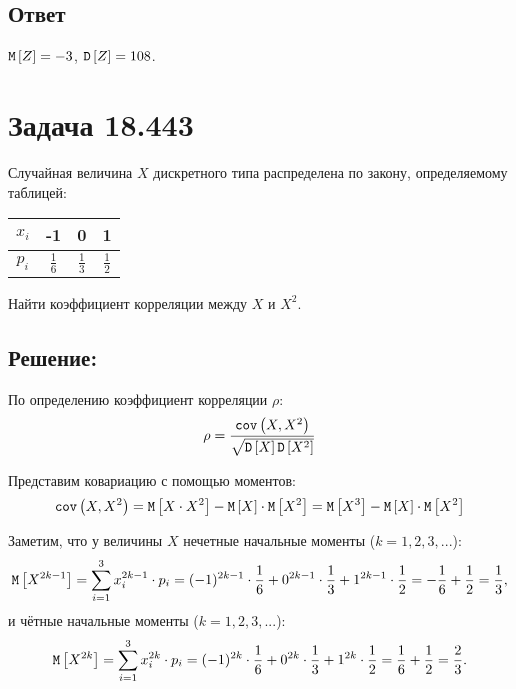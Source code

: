 \subsection*{Ответ}
$\mathtt{M} \left [ Z \right ] = -3$, $\mathtt{D} \left [ Z \right ] = 108$.


\section*{Задача 18.443}

Случайная величина $X$ дискретного типа распределена по закону, определяемому таблицей:

\begin{tabular}{|c|c|c|c|}
    \hline
    $x_i$ & -1            & 0             & 1             \\
    \hline
    $p_i$ & $\frac{1}{6}$ & $\frac{1}{3}$ & $\frac{1}{2}$ \\
    \hline
\end{tabular}

Найти коэффициент корреляции между $X$ и $X^2$.

\subsection*{Решение:}

По определению коэффициент корреляции $\rho$:
\begin{equation}
    \rho = \frac{\texttt{cov} \left ( X , X^2 \right )}{\sqrt{\mathtt{D} \left [ X \right ] \mathtt{D} \left [ X^2 \right ]}}
\end{equation}

Представим ковариацию с помощью моментов:
\begin{equation}
    \texttt{cov} \left ( X , X^2 \right )
    = \mathtt{M} \left [ X \cdot X^2 \right ] - \mathtt{M} \left [ X \right ] \cdot \mathtt{M} \left [ X^2 \right ]
    = \mathtt{M} \left [ X^3 \right ] - \mathtt{M} \left [ X \right ] \cdot \mathtt{M} \left [ X^2 \right ]
\end{equation}

Заметим, что у величины $X$ нечетные начальные моменты ($k=1,2,3,...$):
\begin{equation}
    \mathtt{M} \left [ X^{2k-1} \right ] = \sum_{i=1}^3 x_i^{2k-1} \cdot p_i = (-1)^{2k-1} \cdot \frac{1}{6} + 0^{2k-1} \cdot \frac{1}{3} + 1^{2k-1} \cdot \frac{1}{2} = - \frac{1}{6} + \frac{1}{2} = \frac{1}{3} ,
\end{equation}
и чётные начальные моменты ($k=1,2,3,...$):
\begin{equation}
    \mathtt{M} \left [ X^{2k} \right ] = \sum_{i=1}^3 x_i^{2k} \cdot p_i = (-1)^{2k} \cdot \frac{1}{6} + 0^{2k} \cdot \frac{1}{3} + 1^{2k} \cdot \frac{1}{2} = \frac{1}{6} + \frac{1}{2} = \frac{2}{3} .
\end{equation}


